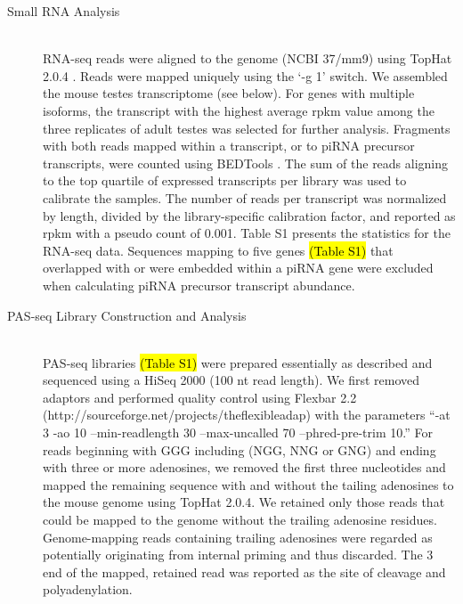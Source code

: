 \begin{description}
    \item[Small RNA Analysis] \hfill \\
    RNA-seq reads were aligned to the genome (NCBI 37/mm9) using TopHat 2.0.4 \citep{Trapnell2009}. Reads were mapped uniquely using the ‘-g 1’ switch. We assembled the mouse testes transcriptome (see below). For genes with multiple isoforms, the transcript with the highest average rpkm value among the three replicates of adult testes was selected for further analysis. Fragments with both reads mapped within a transcript, or to piRNA precursor transcripts, were counted using BEDTools \citep{Quinlan2010}. The sum of the reads aligning to the top quartile of expressed transcripts per library was used to calibrate the samples. The number of reads per transcript was normalized by length, divided by the library-specific calibration factor, and reported as rpkm with a pseudo count of 0.001. Table S1 presents the statistics for the RNA-seq data. Sequences mapping to five genes \hl{(Table S1)} that overlapped with or were embedded within a piRNA gene were excluded when calculating piRNA precursor transcript abundance.

    \item[PAS-seq Library Construction and Analysis] \hfill \\
    PAS-seq libraries \hl{(Table S1)} were prepared essentially as described \citep{Shepard2011} and sequenced using a HiSeq 2000 (100 nt read length). We first removed adaptors and performed quality control using Flexbar 2.2 (http://sourceforge.net/projects/theflexibleadap) with the parameters “-at 3 -ao 10 --min-readlength 30 --max-uncalled 70 --phred-pre-trim 10.” For reads beginning with GGG including (NGG, NNG or GNG) and ending with three or more adenosines, we removed the first three nucleotides and mapped the remaining sequence with and without the tailing adenosines to the mouse genome using TopHat 2.0.4. We retained only those reads that could be mapped to the genome without the trailing adenosine residues. Genome-mapping reads containing trailing adenosines were regarded as potentially originating from internal priming and thus discarded. The 3\textprime~ end of the mapped, retained read was reported as the site of cleavage and polyadenylation.


\end{description}
